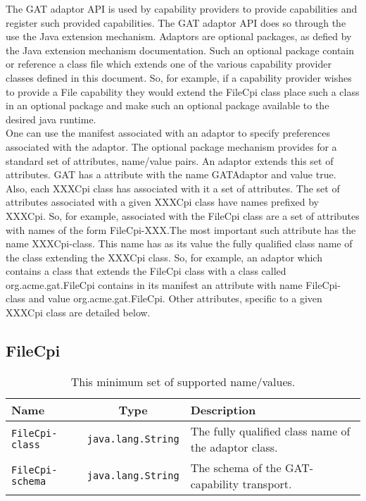 \documentclass[$Date: 2003/06/26 19:29:31 $]{glabarticle}
\begin{document}
The GAT adaptor API is used by capability providers to provide capabilities and register such provided 
capabilities. The GAT adaptor API does so through the use the Java extension mechanism. Adaptors are
optional packages, as defied by the Java extension mechanism documentation. Such an optional package
contain or reference a class file which extends one of the various capability provider classes defined in this
document. So, for example, if a capability provider wishes to provide a File capability they would extend 
the FileCpi class place such a class in an optional package and make such an optional package available to 
the desired java runtime. \\

One can use the manifest associated with an adaptor to specify preferences associated with the adaptor. 
The optional package mechanism provides for a standard set of attributes, name/value pairs. An adaptor 
extends this set of  attributes. GAT has a attribute with the name GATAdaptor and value true. Also, each 
XXXCpi  class has associated with it a set of attributes. The set of attributes associated with a given XXXCpi 
class have names prefixed by XXXCpi. So, for example,  associated with the FileCpi class are a set of 
attributes with names of the form FileCpi-XXX.The most important such attribute has the name 
XXXCpi-class. This name has as its value the fully qualified class name of the class extending the 
XXXCpi class. So, for example, an adaptor which contains a class that extends the FileCpi class with a 
class called org.acme.gat.FileCpi contains in its manifest an attribute with name FileCpi-class and value 
org.acme.gat.FileCpi. Other attributes, specific to a given XXXCpi class are detailed below.

\newpage

\subsection{FileCpi}

\begin{table}[htp]
\begin{center}
\begin{tabular}{|l|c|l|} \hline
Name & Type & Description \\ \hline\hline
\verb"FileCpi-class" & \verb"java.lang.String" & The fully qualified class name of the adaptor class. \\ \hline
\verb"FileCpi-schema" & \verb"java.lang.String" & The schema of the GAT-capability transport. \\ \hline
\end{tabular}
\end{center}
\caption{This minimum set of supported name/values.}
\label{table:SRD}
\end{table}
\end{document}
